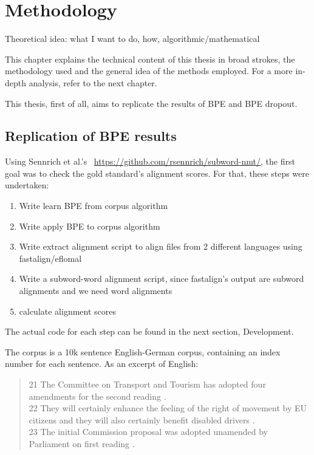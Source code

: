 %
%

\chapter{Methodology}\label{sec:methodology}

Theoretical idea: what I want to do, how, algorithmic/mathematical

This chapter explains the technical content of this thesis in broad strokes, the methodology used and the general idea of the methods employed. For a more in-depth analysis, refer to the next chapter.

This thesis, first of all, aims to replicate the results of BPE and BPE dropout.

\section{Replication of BPE results}

Using Sennrich et al.'s~\cite{sennrich2015neural} \href{code on Github}{https://github.com/rsennrich/subword-nmt/}, the first goal was to check the gold standard's alignment scores. For that, these steps were undertaken:

\begin{enumerate}
	\item Write learn BPE from corpus algorithm
	\item Write apply BPE to corpus algorithm
	\item Write extract alignment script to align files from 2 different languages using fastalign/eflomal
	\item Write a subword-word alignment script, since fastalign's output are subword alignments and we need word alignments
	\item calculate alignment scores
\end{enumerate}

The actual code for each step can be found in the next section, Development.

The corpus is a 10k sentence English-German corpus, containing an index number for each sentence. As an excerpt of English:

\begin{quote}
	21	The Committee on Transport and Tourism has adopted four amendments for the second reading .\\
	22	They will certainly enhance the feeling of the right of movement by EU citizens and they will also certainly benefit disabled drivers .\\
	23	The initial Commission proposal was adopted unamended by Parliament on first reading .
\end{quote}

